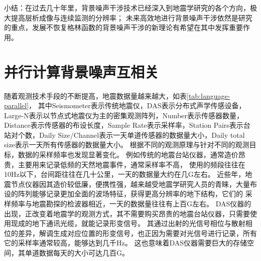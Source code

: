 小结：在过去几十年里，背景噪声干涉技术已经深入到地震学研究的各个方向，极大提高层析成像与连续监测的分辨率；
未来高效地进行背景噪声干涉依然是研究的重点，发展不恢复格林函数的背景噪声干涉的新理论有希望在其中发挥重要作用。


\section{并行计算背景噪声互相关}


随着观测技术手段的不断提高，地震数据量越来越大，如表\ref{tab:language-parallel}，
其中Seismometer表示传统地震仪，DAS表示分布式声学传感设备，Large-N表示以节点式地震仪为主的密集观测阵列，Number表示传感器数量，
Distance表示传感器的布设长度，Sample Rate表示采样率，Station Pairs表示台站对个数，Daily Size/Channel表示一天单道传感器的数据量大小，Daily total size表示一天所有传感器的数据量大小。
根据不同的观测原理与针对不同的观测目标，数据的采样频率也发现显著变化。
例如传统的地震台站仪器，通常造价昂贵，主要用来记录低频的天然地震事件，通常采样率不高，
使用的频段往往在10Hz以下，台间距往往在几十公里，一天的数据量大约在几G左右。
近些年，地震节点仪器因其造价较低廉，便携性强，越来越受地震学研究人员的青睐，大量布设的阵列能够记录更加全面的波场特征，获得更高分辨率的地下结构，它们的
采样频率与地震勘探的检波器相近，一天的数据量往往有上百G左右。
DAS仪器的出现，正改变着地震学的观测方式，其不需要购买昂贵的地震台站仪器，只需要使用现成的地下通讯光缆，就能记录形变信号。
其通过出射的光信号相位与散射相位的差异，解调生成对应位置的形变信号，也正因为需要对光信号进行记录，所有它的采样率通常较高，能够达到几千Hz。
这也意味着DAS仪器需要巨大的存储空间，其单道数据每天的大小可达几百G。

